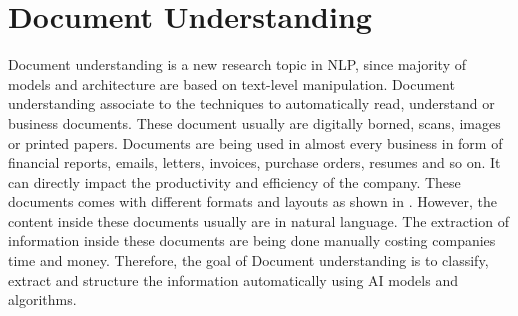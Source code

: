 \section{Document Understanding}

Document understanding is a new research topic in NLP, since majority of models and architecture are based on text-level manipulation. Document understanding associate to the techniques to automatically read, understand or business documents. These document usually are digitally borned, scans, images or printed papers. Documents are being used in almost every business in form of financial reports, emails, letters, invoices, purchase orders, resumes and so on. It can directly impact the productivity and efficiency of the company. These documents comes with different formats and layouts as shown in . However, the content inside these documents usually are in natural language. The extraction of information inside these documents are being done manually costing companies time and money. Therefore, the goal of Document understanding is to classify, extract and structure the information automatically using AI models and algorithms. 


